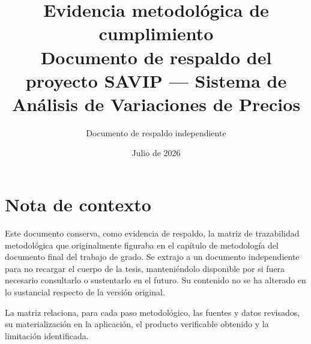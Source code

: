\documentclass[11pt]{article}
\title{Evidencia metodológica de cumplimiento\\
\large Documento de respaldo del proyecto SAVIP --- Sistema de Análisis de Variaciones de Precios}
\author{Documento de respaldo independiente}
\date{Julio de 2026}
\begin{document}
\maketitle

\section*{Nota de contexto}

Este documento conserva, como evidencia de respaldo, la matriz de trazabilidad
metodológica que originalmente figuraba en el capítulo de metodología del
documento final del trabajo de grado. Se extrajo a un documento independiente
para no recargar el cuerpo de la tesis, manteniéndolo disponible por si fuera
necesario consultarlo o sustentarlo en el futuro. Su contenido no se ha
alterado en lo sustancial respecto de la versión original.

La matriz relaciona, para cada paso metodológico, las fuentes y datos
revisados, su materialización en la aplicación, el producto verificable
obtenido y la limitación identificada.
\end{document}
